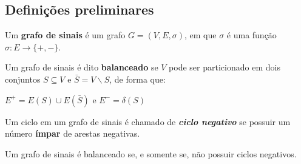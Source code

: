 \documentclass[
12pt,notheorems,hyperref={pdfauthor=whatever}
]{beamer}
\begin{document}
\subsection{Definições preliminares}
\begin{frame}[fragile]
	\begin{definition}
		Um \textbf{grafo de sinais} é um grafo $G = (V, E, \sigma)$, em que $\sigma$ é uma função $\sigma: E \to \{+,-\}$.
	\end{definition}
	\begin{minipage}[h][12em][c]{\textwidth}
		\centering%
			\vspace{1em}
		
		\label{fig:bis-instance}
	\end{minipage}
\end{frame}
\begin{frame}
    \begin{definition}
		Um grafo de sinais é dito \textbf{balanceado} se $V$ pode ser particionado em dois conjuntos $S \subseteq V$ e $\bar{S} = V \backslash S$, de forma que: 
        \begin{center}
            $E^+ = E(S) \cup E(\bar{S})$ e $E^- = \delta(S)$
        \end{center}
	\end{definition}
	\begin{minipage}[h][12em][c]{\textwidth}
		\centering%
		
	\end{minipage}
\end{frame}
\begin{frame}
    \begin{definition}
        Um ciclo em um grafo de sinais é chamado de \textbf{\textit{ciclo negativo}} se possuir um número \textbf{ímpar} de arestas negativas.
    \end{definition}
    \begin{minipage}[h][10em][c]{\textwidth}
		\centering%
		
        \vspace{2em}
		\small{}
	\end{minipage}
    \vspace{-2.5em}
    \pause
    \begin{theorem}\label{teo:neg-cycle}
        Um grafo de sinais é balanceado se, e somente se, não possuir ciclos negativos.
    \end{theorem}
\end{frame}
\end{document}
